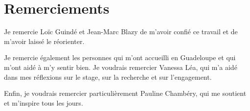 \chapter*{Remerciements}


Je remercie Loïc Guindé et Jean-Marc Blazy de m'avoir confié ce travail et de m'avoir laissé le
réorienter.

Je remercie également les personnes qui m'ont accueilli en Guadeloupe et qui m'ont aidé à m'y
sentir bien. Je voudrais remercier Vanessa Léa, qui m'a aidé dans mes réflexions sur le stage,
sur la recherche et sur l'engagement.

Enfin, je voudrais remercier particulièrement Pauline Chambéry, qui me soutient et m'inspire
tous les jours.

